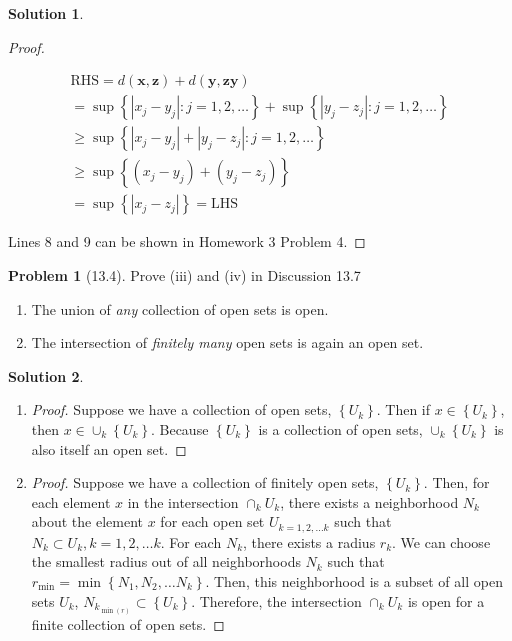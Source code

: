 \documentclass[12pt]{article}
\theoremstyle{definition} %
\newtheorem{solution}{Solution}
\newtheorem{problem}{Problem}
\theoremstyle{plain} %
\begin{document}
\begin{solution}
\begin{proof}
\begin{enumerate}
   \begin{align}
\text{RHS} = d(\mathbf{x}, \mathbf{z})+d(\mathbf{y}, \mathbf{zy})\\[10pt] 
= \sup\left\{ \left\vert x_{j}-y_{j} \right\vert : j=1,2, \ldots   \right\}+ \sup\left\{ \left\vert y_{j}-z_{j} \right\vert : j=1,2, \ldots   \right\} \\[10pt] 
\geq  \sup\left\{ \left\vert x_{j}-y_{j} \right\vert +\left\vert y_{j} -z_{j}  \right\vert : j=1,2, \ldots   \right\}\\[10pt] 
\geq \sup \left\{ (x_{j} -y_{j} )+(y_{j} -z_{j} ) \right\} \\[10pt] 
=\sup \left\{ \left\vert x_{j} -z_{j} \right\vert   \right\} =\text{LHS} 
   \end{align}
\end{enumerate} 
Lines 8 and 9 can be shown in Homework 3 Problem 4.
\end{proof}
\end{solution}

\begin{problem}[13.4]
    Prove (iii) and (iv) in Discussion 13.7
    \begin{enumerate}
        \item The union of \emph{any} collection of open sets is open.
        \item The intersection of \emph{finitely many} open sets is again an open set.
    \end{enumerate}
\end{problem}

\begin{solution}
    \begin{enumerate}
        \item \begin{proof}
        Suppose we have a collection of open sets, $\left\{ U_k\right\} $. Then if $x\in \left\{ U_k\right\} $, then $x\in \cup_k \left\{ U_k \right\} $. Because $\left\{ U_k \right\} $ is a collection of open sets, $\cup_k \left\{ U_k \right\} $ is also itself an open set. 
    \end{proof}
    \item
    \begin{proof}
        Suppose we have a collection of finitely open sets, $\left\{ U_k \right\}$. Then, for each element $x$ in the intersection $\cap_k U_k$, there exists a neighborhood $N_k$ about the element $x$ for each open set $U_{ k=1,2, \ldots  k}  $ such that $N_k\subset U_k, k=1,2, \ldots  k $. For each $N_k$, there exists a radius $r_k$. We can choose the smallest radius out of all neighborhoods $N_k$ such that $r_{\mathop{\min}}=\mathop{\min} \left\{ N_1,N_{2}, \ldots  N_k   \right\} $. Then, this neighborhood is a subset of all open sets $U_k$, $N_{k_{\mathop{\min}(r) } }\subset \left\{U_k \right\} $.  Therefore, the intersection $\cap_k U_k$ is open for a finite collection of open sets.     
    \end{proof}
    \end{enumerate}
    \end{solution}
\end{document}
